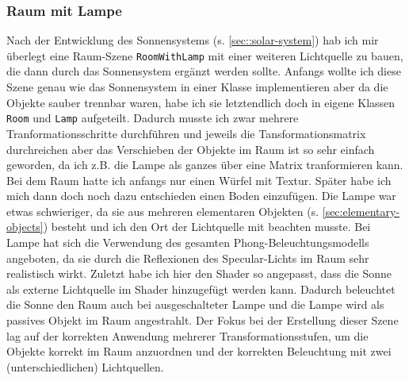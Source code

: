 \documentclass{article}
\let\oldsubsubsection\subsubsection
\renewcommand\subsubsection{\needspace{7\baselineskip}\oldsubsubsection}
\begin{document}
\subsubsection{Raum mit Lampe}
Nach der Entwicklung des Sonnensystems (s. \ref{sec::solar-system}) hab ich mir überlegt eine Raum-Szene \texttt{RoomWithLamp} mit einer weiteren Lichtquelle zu bauen, die dann durch das Sonnensystem ergänzt werden sollte.
Anfangs wollte ich diese Szene genau wie das Sonnensystem in einer Klasse implementieren aber da die Objekte sauber trennbar waren, habe ich sie letztendlich doch in eigene Klassen \texttt{Room} und \texttt{Lamp} aufgeteilt.
Dadurch musste ich zwar mehrere Tranformationsschritte durchführen und jeweils die Tansformationsmatrix durchreichen aber das Verschieben der Objekte im Raum ist so sehr einfach geworden, da ich z.B. die Lampe als ganzes über eine Matrix tranformieren kann.
Bei dem Raum hatte ich anfangs nur einen Würfel mit Textur. Später habe ich mich dann doch noch dazu entschieden einen Boden einzufügen.
Die Lampe war etwas schwieriger, da sie aus mehreren elementaren Objekten (s. \ref{sec:elementary-objects}) besteht und ich den Ort der Lichtquelle mit beachten musste.
Bei Lampe hat sich die Verwendung des gesamten Phong-Beleuchtungsmodells angeboten, da sie durch die Reflexionen des Specular-Lichts im Raum sehr realistisch wirkt.
Zuletzt habe ich hier den Shader so angepasst, dass die Sonne als externe Lichtquelle im Shader hinzugefügt werden kann.
Dadurch beleuchtet die Sonne den Raum auch bei ausgeschalteter Lampe und die Lampe wird als passives Objekt im Raum angestrahlt.
Der Fokus bei der Erstellung dieser Szene lag auf der korrekten Anwendung mehrerer Transformationsstufen, um die Objekte korrekt im Raum anzuordnen und der korrekten Beleuchtung mit zwei (unterschiedlichen) Lichtquellen.
\end{document}
